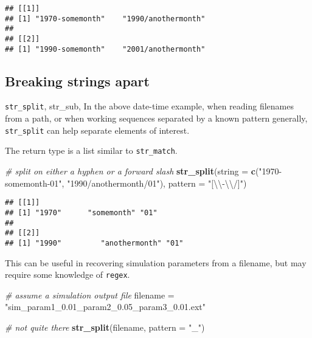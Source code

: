 \documentclass[
]{book}
\newenvironment{Shaded}{}{}
\newcommand{\CharTok}[1]{\textcolor[rgb]{0.25,0.44,0.63}{#1}}
\newcommand{\CommentTok}[1]{\textcolor[rgb]{0.38,0.63,0.69}{\textit{#1}}}
\newcommand{\DataTypeTok}[1]{\textcolor[rgb]{0.56,0.13,0.00}{#1}}
\newcommand{\KeywordTok}[1]{\textcolor[rgb]{0.00,0.44,0.13}{\textbf{#1}}}
\newcommand{\NormalTok}[1]{#1}
\newcommand{\StringTok}[1]{\textcolor[rgb]{0.25,0.44,0.63}{#1}}
\begin{document}
\begin{verbatim}
## [[1]]
## [1] "1970-somemonth"    "1990/anothermonth"
## 
## [[2]]
## [1] "1990-somemonth"    "2001/anothermonth"
\end{verbatim}

\hypertarget{breaking-strings-apart}{%
\subsection{Breaking strings apart}\label{breaking-strings-apart}}

\texttt{str\_split}, str\_sub,
In the above date-time example, when reading filenames from a path, or when working sequences separated by a known pattern generally, \texttt{str\_split} can help separate elements of interest.

The return type is a list similar to \texttt{str\_match}.

\begin{Shaded}
\begin{Highlighting}[]
\CommentTok{# split on either a hyphen or a forward slash}
\KeywordTok{str_split}\NormalTok{(}\DataTypeTok{string =} \KeywordTok{c}\NormalTok{(}\StringTok{"1970-somemonth-01"}\NormalTok{,}
                     \StringTok{"1990/anothermonth/01"}\NormalTok{),}
          \DataTypeTok{pattern =} \StringTok{"[}\CharTok{\textbackslash{}\textbackslash{}}\StringTok{-}\CharTok{\textbackslash{}\textbackslash{}}\StringTok{/]"}\NormalTok{)}
\end{Highlighting}
\end{Shaded}

\begin{verbatim}
## [[1]]
## [1] "1970"      "somemonth" "01"       
## 
## [[2]]
## [1] "1990"         "anothermonth" "01"
\end{verbatim}

This can be useful in recovering simulation parameters from a filename, but may require some knowledge of \texttt{regex}.

\begin{Shaded}
\begin{Highlighting}[]
\CommentTok{# assume a simulation output file}
\NormalTok{filename =}\StringTok{ "sim_param1_0.01_param2_0.05_param3_0.01.ext"}

\CommentTok{# not quite there}
\KeywordTok{str_split}\NormalTok{(filename, }\DataTypeTok{pattern =} \StringTok{"_"}\NormalTok{)}
\end{Highlighting}
\end{Shaded}
\end{document}
